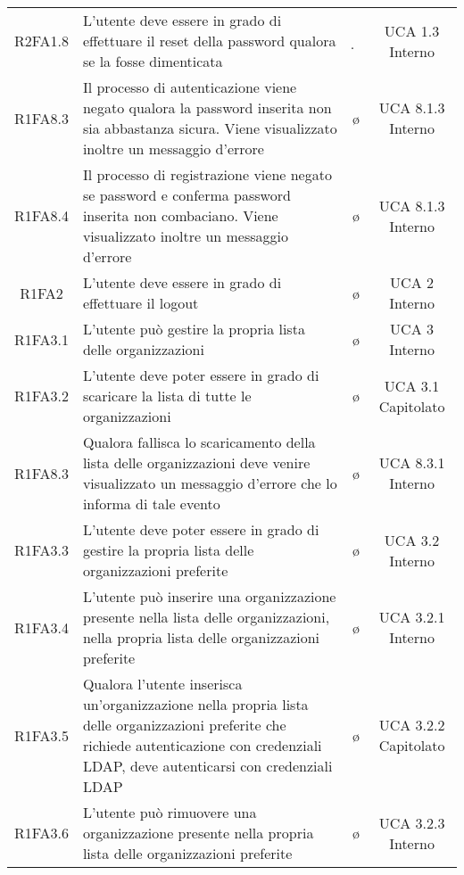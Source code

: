 {\begin{longtable}{ c C{4cm} c c}
R2FA1.8 & L'utente deve essere in grado di effettuare il reset della password qualora se la fosse dimenticata & \d & UCA 1.3 Interno\\

R1FA8.3 & Il processo di autenticazione viene negato qualora la password inserita non sia abbastanza sicura. Viene visualizzato inoltre un messaggio d'errore & \o & UCA 8.1.3 Interno\\

R1FA8.4 & Il processo di registrazione viene negato se password e conferma password inserita non combaciano. Viene visualizzato inoltre un messaggio d'errore & \o & UCA 8.1.3 Interno\\


R1FA2 & L'utente deve essere in grado di effettuare il logout & \o & UCA 2 Interno\\

R1FA3.1 & L'utente può gestire la propria lista delle organizzazioni& \o & UCA 3 Interno\\

R1FA3.2 & L'utente deve poter essere in grado di scaricare la lista di tutte le organizzazioni & \o & UCA 3.1 Capitolato \\

R1FA8.3 & Qualora fallisca lo scaricamento della lista delle organizzazioni deve venire visualizzato un messaggio d'errore che lo informa di tale evento & \o & UCA 8.3.1 Interno \\

R1FA3.3 & L’utente deve poter essere in grado di gestire la propria lista delle organizzazioni preferite & \o & UCA 3.2 Interno \\

R1FA3.4 & L’utente può inserire una organizzazione presente nella lista delle organizzazioni, nella propria lista delle organizzazioni preferite & \o & UCA 3.2.1 Interno \\

R1FA3.5 & Qualora l’utente inserisca un'organizzazione nella propria lista delle organizzazioni preferite che richiede autenticazione con credenziali LDAP, deve autenticarsi con credenziali LDAP & \o & UCA 3.2.2 Capitolato\\

R1FA3.6 & L’utente può rimuovere una organizzazione presente nella propria lista delle organizzazioni preferite & \o & UCA 3.2.3 Interno \\


\end{longtable}}
